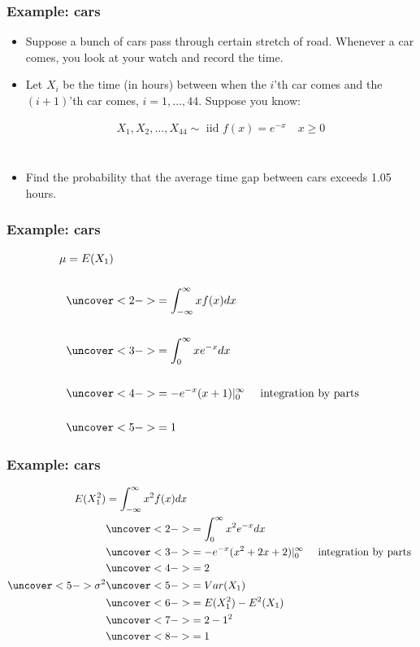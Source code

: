 \documentclass[handout]{beamer}\usepackage[]{graphicx}\usepackage[]{color}
\numberwithin{equation}{section}
\begin{document}
\begin{frame}
\frametitle{Example: cars}
\begin{itemize}
\pause \item Suppose a bunch of cars pass through certain stretch of road. Whenever a car comes, you look at your watch and record the time. 
\pause \item Let $X_i$ be the time (in hours) between when the $i$'th car comes and the $(i + 1)$'th car comes, $i = 1, \ldots, 44$. Suppose you know:

\pause \pause \begin{align*}
X_1, X_2, \ldots, X_{44} \sim \text{ iid } f(x) = e^{-x} \quad x \ge 0 \\
\end{align*} $\quad$

\pause \item Find the probability that the average time gap between cars exceeds 1.05 hours.
\end{itemize}
\end{frame}


\begin{frame}
\frametitle{Example: cars}
\begin{align*}
\mu &= E(X_1) \\ \\
&\uncover<2->{= \int_{-\infty}^\infty x f(x) dx} \\ \\
&\uncover<3->{= \int_{0}^\infty x e^{-x} dx} \\ \\
&\uncover<4->{= -e^{-x}(x+1)|_{0}^{\infty} \quad \text{ integration by parts }} \\ \\
&\uncover<5->{ = 1}
\end{align*}
\end{frame}


\begin{frame}
\frametitle{Example: cars}
\begin{align*}
E(X_1^2) &= \int_{-\infty}^\infty x^2 f(x) dx \\ 
&\uncover<2->{= \int_{0}^\infty x^2 e^{-x} dx} \\ 
&\uncover<3->{= -e^{-x}(x^2 + 2x + 2)|_{0}^{\infty} \quad \text{ integration by parts }} \\ 
&\uncover<4->{ = 2} \\
\uncover<5->{\sigma^2} & \uncover<5->{= Var(X_1)} \\
&\uncover<6->{= E(X_1^2) - E^2(X_1)} \\
& \uncover<7->{= 2 - 1^2} \\
& \uncover<8->{= 1}
\end{align*}
\end{frame}
\end{document}

